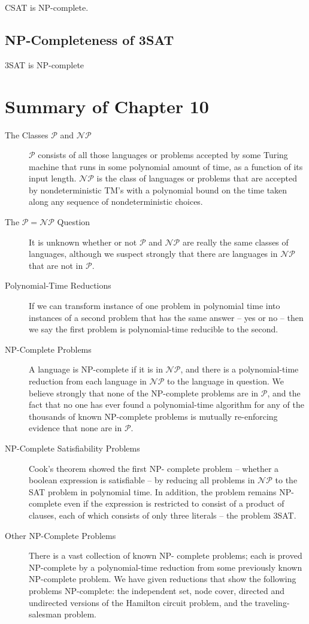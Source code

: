\documentclass[]{article}
\begin{document}
\begin{thm}
CSAT is NP-complete.
\end{thm}

\subsection*{NP-Completeness of 3SAT}
\begin{thm}
3SAT is NP-complete
\end{thm}

\section*{Summary of Chapter 10}
\begin{description}
\item[The Classes $\mathcal{P}$ and $\mathcal{NP}$] $\mathcal{P}$ consists of
all those languages or problems accepted by some Turing machine that runs in
some polynomial amount of time, as a function of its input length.
$\mathcal{NP}$ is the class of languages or problems that are accepted by
nondeterministic TM's with a polynomial bound on the time taken along any
sequence of nondeterministic choices.
\item[The $\mathcal{P} = \mathcal{NP}$ Question] It is unknown whether or not
$\mathcal{P}$ and $\mathcal{NP}$ are really the same classes of languages,
although we suspect strongly that there are languages in $\mathcal{NP}$ that are
not in $\mathcal{P}$.
\item[Polynomial-Time Reductions] If we can transform instance of one problem in
polynomial time into instances of a second problem that has the same answer --
yes or no -- then we say the first problem is polynomial-time reducible to the
second.
\item[NP-Complete Problems] A language is NP-complete if it is in
$\mathcal{NP}$, and there is a polynomial-time reduction from each language in
$\mathcal{NP}$ to the language in question. We believe strongly that none of the
NP-complete problems are in $\mathcal{P}$, and the fact that no one has ever
found a polynomial-time algorithm for any of the thousands of known NP-complete
problems is mutually re-enforcing evidence that none are in $\mathcal{P}$.
\item[NP-Complete Satisfiability Problems] Cook's theorem showed the first NP-
complete problem -- whether a boolean expression is satisfiable -- by reducing
all problems in $\mathcal{NP}$ to the SAT problem in polynomial time. In
addition, the problem remains NP-complete even if the expression is restricted
to consist of a product of clauses, each of which consists of only three
literals -- the problem 3SAT.
\item[Other NP-Complete Problems] There is a vast collection of known NP-
complete problems; each is proved NP-complete by a polynomial-time reduction
from some previously known NP-complete problem. We have given reductions that
show the following problems NP-complete: the independent set, node cover,
directed and undirected versions of the Hamilton circuit problem, and the
traveling-salesman problem.
\end{description}
\end{document}
